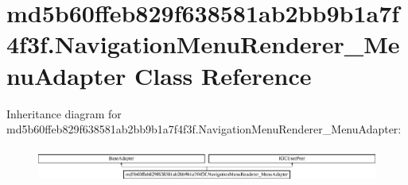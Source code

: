 \hypertarget{classmd5b60ffeb829f638581ab2bb9b1a7f4f3f_1_1NavigationMenuRenderer__MenuAdapter}{}\section{md5b60ffeb829f638581ab2bb9b1a7f4f3f.\+Navigation\+Menu\+Renderer\+\_\+\+Menu\+Adapter Class Reference}
\label{classmd5b60ffeb829f638581ab2bb9b1a7f4f3f_1_1NavigationMenuRenderer__MenuAdapter}
Inheritance diagram for md5b60ffeb829f638581ab2bb9b1a7f4f3f.\+Navigation\+Menu\+Renderer\+\_\+\+Menu\+Adapter\+:\begin{figure}[H]
\begin{center}
\leavevmode
\includegraphics[height=1.161826cm]{classmd5b60ffeb829f638581ab2bb9b1a7f4f3f_1_1NavigationMenuRenderer__MenuAdapter}
\end{center}
\end{figure}
